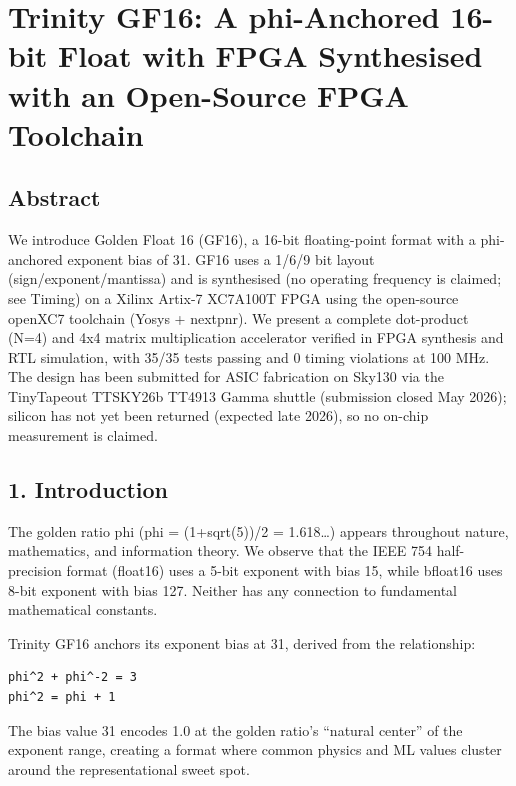 \documentclass[
]{article}
\author{}
\date{}
\begin{document}
\section{Trinity GF16: A phi-Anchored 16-bit Float with FPGA
Synthesised with an Open-Source FPGA
Toolchain}\label{trinity-gf16-a-phi-anchored-16-bit-float-synthesised-with-an-open-source-fpga-toolchain}

\subsection{Abstract}\label{abstract}

We introduce Golden Float 16 (GF16), a 16-bit floating-point format with
a phi-anchored exponent bias of 31. GF16 uses a 1/6/9 bit layout
(sign/exponent/mantissa) and is synthesised (no operating frequency is claimed; see Timing)
on a Xilinx Artix-7 XC7A100T FPGA using the open-source openXC7
toolchain (Yosys + nextpnr). We present a complete dot-product (N=4) and
4x4 matrix multiplication accelerator verified in FPGA synthesis and
RTL simulation, with 35/35 tests passing and 0 timing violations at
100 MHz. The design has been submitted for ASIC fabrication on Sky130
via the TinyTapeout TTSKY26b TT4913 Gamma shuttle (submission closed
May 2026); silicon has not yet been returned (expected late 2026), so
no on-chip measurement is claimed.

\subsection{1. Introduction}\label{introduction}

The golden ratio phi (phi = (1+sqrt(5))/2 = 1.618\ldots) appears
throughout nature, mathematics, and information theory. We observe that
the IEEE 754 half-precision format (float16) uses a 5-bit exponent with
bias 15, while bfloat16 uses 8-bit exponent with bias 127. Neither has
any connection to fundamental mathematical constants.

Trinity GF16 anchors its exponent bias at 31, derived from the
relationship:

\begin{verbatim}
phi^2 + phi^-2 = 3
phi^2 = phi + 1
\end{verbatim}

The bias value 31 encodes 1.0 at the golden ratio's ``natural center''
of the exponent range, creating a format where common physics and ML
values cluster around the representational sweet spot.
\end{document}
